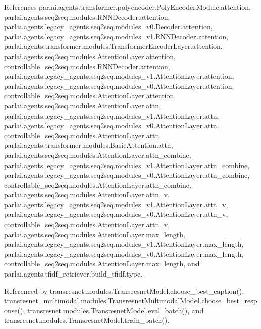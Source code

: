 References parlai.\+agents.\+transformer.\+polyencoder.\+Poly\+Encoder\+Module.\+attention, parlai.\+agents.\+seq2seq.\+modules.\+R\+N\+N\+Decoder.\+attention, parlai.\+agents.\+legacy\+\_\+agents.\+seq2seq.\+modules\+\_\+v0.\+Decoder.\+attention, parlai.\+agents.\+legacy\+\_\+agents.\+seq2seq.\+modules\+\_\+v1.\+R\+N\+N\+Decoder.\+attention, parlai.\+agents.\+transformer.\+modules.\+Transformer\+Encoder\+Layer.\+attention, parlai.\+agents.\+seq2seq.\+modules.\+Attention\+Layer.\+attention, controllable\+\_\+seq2seq.\+modules.\+R\+N\+N\+Decoder.\+attention, parlai.\+agents.\+legacy\+\_\+agents.\+seq2seq.\+modules\+\_\+v1.\+Attention\+Layer.\+attention, parlai.\+agents.\+legacy\+\_\+agents.\+seq2seq.\+modules\+\_\+v0.\+Attention\+Layer.\+attention, controllable\+\_\+seq2seq.\+modules.\+Attention\+Layer.\+attention, parlai.\+agents.\+seq2seq.\+modules.\+Attention\+Layer.\+attn, parlai.\+agents.\+legacy\+\_\+agents.\+seq2seq.\+modules\+\_\+v1.\+Attention\+Layer.\+attn, parlai.\+agents.\+legacy\+\_\+agents.\+seq2seq.\+modules\+\_\+v0.\+Attention\+Layer.\+attn, controllable\+\_\+seq2seq.\+modules.\+Attention\+Layer.\+attn, parlai.\+agents.\+transformer.\+modules.\+Basic\+Attention.\+attn, parlai.\+agents.\+seq2seq.\+modules.\+Attention\+Layer.\+attn\+\_\+combine, parlai.\+agents.\+legacy\+\_\+agents.\+seq2seq.\+modules\+\_\+v1.\+Attention\+Layer.\+attn\+\_\+combine, parlai.\+agents.\+legacy\+\_\+agents.\+seq2seq.\+modules\+\_\+v0.\+Attention\+Layer.\+attn\+\_\+combine, controllable\+\_\+seq2seq.\+modules.\+Attention\+Layer.\+attn\+\_\+combine, parlai.\+agents.\+seq2seq.\+modules.\+Attention\+Layer.\+attn\+\_\+v, parlai.\+agents.\+legacy\+\_\+agents.\+seq2seq.\+modules\+\_\+v1.\+Attention\+Layer.\+attn\+\_\+v, parlai.\+agents.\+legacy\+\_\+agents.\+seq2seq.\+modules\+\_\+v0.\+Attention\+Layer.\+attn\+\_\+v, controllable\+\_\+seq2seq.\+modules.\+Attention\+Layer.\+attn\+\_\+v, parlai.\+agents.\+seq2seq.\+modules.\+Attention\+Layer.\+max\+\_\+length, parlai.\+agents.\+legacy\+\_\+agents.\+seq2seq.\+modules\+\_\+v1.\+Attention\+Layer.\+max\+\_\+length, parlai.\+agents.\+legacy\+\_\+agents.\+seq2seq.\+modules\+\_\+v0.\+Attention\+Layer.\+max\+\_\+length, controllable\+\_\+seq2seq.\+modules.\+Attention\+Layer.\+max\+\_\+length, and parlai.\+agents.\+tfidf\+\_\+retriever.\+build\+\_\+tfidf.\+type.



Referenced by transresnet.\+modules.\+Transresnet\+Model.\+choose\+\_\+best\+\_\+caption(), transresnet\+\_\+multimodal.\+modules.\+Transresnet\+Multimodal\+Model.\+choose\+\_\+best\+\_\+response(), transresnet.\+modules.\+Transresnet\+Model.\+eval\+\_\+batch(), and transresnet.\+modules.\+Transresnet\+Model.\+train\+\_\+batch().


